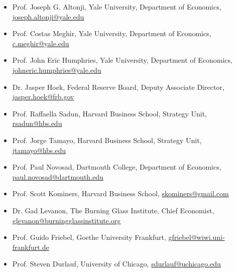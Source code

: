 \documentclass[11pt,letterpaper]{article}
\begin{document}
\begin{itemize}
\item Prof. Joseph G. Altonji, Yale University, Department of Economics, \href{mailto:joseph.altonji@yale.edu}{joseph.altonji@yale.edu}
\item Prof. Costas Meghir, Yale University, Department of Economics, \href{mailto:c.meghir@yale.edu}{c.meghir@yale.edu}
\item Prof. John Eric Humphries, Yale University, Department of Economics, \href{mailto:johneric.humphries@yale.edu}{johneric.humphries@yale.edu}
\item Dr. Jasper Hoek, Federal Reserve Board, Deputy Associate Director, \href{mailto:jasper.hoek@frb.gov}{jasper.hoek@frb.gov}
\item Prof. Raffaella Sadun, Harvard Business School, Strategy Unit, \href{mailto:rsadun@hbs.edu}{rsadun@hbs.edu}
\item Prof. Jorge Tamayo, Harvard Business School, Strategy Unit, \href{mailto:jtamayo@hbs.edu}{jtamayo@hbs.edu}
\item Prof. Paul Novosad, Dartmouth College, Department of Economics, \href{mailto:paul.novosad@dartmouth.edu}{paul.novosad@dartmouth.edu}
\item Prof. Scott Kominers, Harvard Business School, \href{mailto:skominers@gmail.com}{skominers@gmail.com}
\item Dr. Gad Levanon, The Burning Glass Institute, Chief Economist, \href{mailto:glevanon@burningglassinstitute.org}{glevanon@burningglassinstitute.org}
\item Prof. Guido Friebel, Goethe University Frankfurt, \href{mailto:gfriebel@wiwi.uni-frankfurt.de}{gfriebel@wiwi.uni-frankfurt.de}
\item Prof. Steven Durlauf, University of Chicago, \href{mailto:sdurlauf@uchicago.edu}{sdurlauf@uchicago.edu}
\end{itemize}
\end{document}
